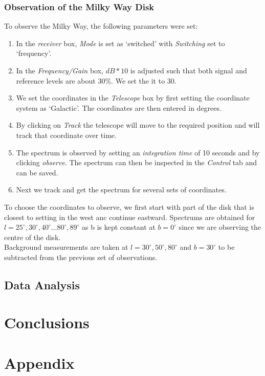 \documentclass[12pt,a4paper]{article}
\begin{document}
        \subsubsection{Observation of the Milky Way Disk}
            To observe the Milky Way, the following parameters were set:
            \begin{enumerate}
                \item In the \textit{receiver} box, \textit{Mode} is set as `switched' with \textit{Switching} set to `frequency'.
                \item In the \textit{Frequency/Gain} box, $dB*10$ is adjusted such that both signal and reference levels are about $30\%$. We set the it to 30.
                \item We set the coordinates in the \textit{Telescope} box by first setting the coordinate system as `Galactic'. The coordinates are then entered in degrees.
                \item By clicking on \textit{Track} the telescope will move to the required position and will track that coordinate over time.
                \item The spectrum is observed by setting an \textit{integration time} of 10 seconds and by clicking \textit{observe}. The spectrum can then be inspected in the \textit{Control} tab and can be saved.
                \item Next we track and get the spectrum for several sets of coordinates. 
            \end{enumerate}
            
            To choose the coordinates to observe, we first start with part of the disk that is closest to setting in the west anc continue eastward. Spectrums are obtained for $l=25^\circ,30^\circ,40^\circ \dots 80^\circ, 89^\circ$ as b is kept constant at $b=0^\circ$ since we are observing the centre of the disk. \\

            Background measurements are taken at $l=30^\circ,50^\circ,80^\circ$ and $b=30^\circ$ to be subtracted from the previous set of observations.

    \subsection{Data Analysis}

\section{Conclusions}


\printbibliography     
\appendix
\section{Appendix}
\end{document}

